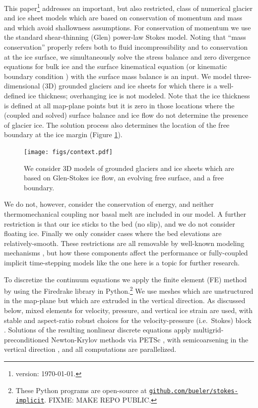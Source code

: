 \documentclass[letterpaper,final,12pt,reqno]{amsart}
\begin{document}
This paper\footnote{version: \today.} addresses an important, but also restricted, class of numerical glacier and ice sheet models which are based on conservation of momentum and mass and which avoid shallowness assumptions.  For conservation of momentum we use the standard shear-thinning (Glen) power-law Stokes model.  Noting that ``mass conservation'' properly refers both to fluid incompressibility and to conservation at the ice surface, we simultaneously solve the stress balance and zero divergence equations for bulk ice and the surface kinematical equation (or kinematic boundary condition \cite{GreveBlatter2009}) with the surface mass balance is an input.  We model three-dimensional (3D) grounded glaciers and ice sheets for which there is a well-defined ice thickness; overhanging ice is not modeled.  Note that the ice thickness is defined at all map-plane points but it is zero in those locations where the (coupled and solved) surface balance and ice flow do not determine the presence of glacier ice.  The solution process also determines the location of the free boundary at the ice margin \cite{SchoofHewitt2013} (Figure \ref{fig:context}).

\begin{figure}[ht]
\begin{center}
\texttt{[image: figs/context.pdf]}
\end{center}
\caption{We consider 3D models of grounded glaciers and ice sheets which are based on Glen-Stokes ice flow, an evolving free surface, and a free boundary.}
\label{fig:context}
\end{figure}

We do not, however, consider the conservation of energy, and neither thermomechanical coupling nor basal melt are included in our model.  A further restriction is that our ice sticks to the bed (no slip), and we do not consider floating ice.  Finally we only consider cases where the bed elevations are relatively-smooth.  These restrictions are all removable by well-known modeling mechanisms \cite[for example]{Aschwandenetal2012,Winkelmannetal2011}, but how these components affect the performance or fully-coupled implicit time-stepping models like the one here is a topic for further research.

To discretize the continuum equations we apply the finite element (FE) method \cite{Elmanetal2014} by using the Firedrake library \cite{Rathgeberetal2016} in Python.\footnote{These Python programs are open-source at \href{https://github.com/bueler/stokes-implicit}{\texttt{github.com/bueler/stokes-implicit}}.  FIXME: MAKE REPO PUBLIC.}  We use meshes which are unstructured in the map-plane but which are extruded \cite{Gibsonetal2019} in the vertical direction.  As discussed below, mixed elements for velocity, pressure, and vertical ice strain are used, with stable and aspect-ratio robust choices for the velocity-pressure (i.e.~Stokes) block \cite{Elmanetal2014}.  Solutions of the resulting nonlinear discrete equations apply multigrid-preconditioned Newton-Krylov methods \cite{Bueler2021} via PETSc \cite{Balayetal2020}, with semicoarsening in the vertical direction \cite{Tuminaroetal2016}, and all computations are parallelized.
\end{document}
